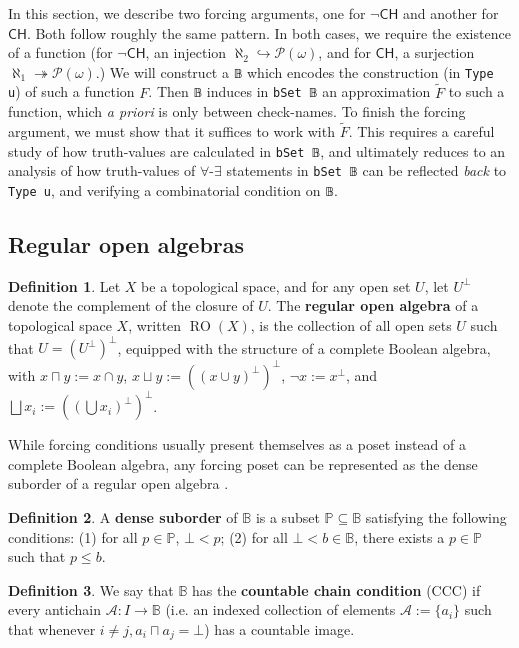 \documentclass[sigplan,10pt,review, autoref,anonymous]{acmart}
\newcommand{\B}{\mathbb{B}}
\newcommand{\lil}{\lstinline}
\newcommand{\CH}{\mathsf{CH}}
\theoremstyle{definition}
\newtheorem{defn}{Definition}[section]
\begin{document}
In this section, we describe two forcing arguments, one for \(\neg \CH\) and another for \(\CH\). Both follow roughly the same pattern. In both cases, we require the existence of a function (for \(\neg \CH\), an injection \(\aleph_2 \hookrightarrow \mathcal{P}(\omega)\), and for \(\CH\), a surjection \(\aleph_1 \twoheadrightarrow \mathcal{P}(\omega)\).) We will construct a \lil{𝔹}  which encodes the construction (in \lil{Type u}) of such a function \(F\). Then \lil{𝔹} induces in \lil{bSet 𝔹} an approximation \(\widetilde{F}\) to such a function, which \emph{a priori} is only between check-names. To finish the forcing argument, we must show that it suffices to work with \(\widetilde{F}\). This requires a careful study of how truth-values are calculated in \lil{bSet 𝔹}, and ultimately reduces to an analysis of how truth-values of \(\forall\)-\(\exists\) statements in \lil{bSet 𝔹} can be reflected \emph{back} to \lil{Type u}, and verifying a combinatorial condition on \lil{𝔹}.

\subsection{Regular open algebras}
\begin{defn}\label{def-regular-open-algebra}
  Let $X$ be a topological space, and for any open set $U$, let $U^\perp$ denote the complement of the closure of $U$. The \textbf{regular open algebra} of a topological space $X$, written $\operatorname{RO}(X)$, is the collection of all open sets $U$ such that $U = (U^\perp)^\perp$, equipped with the structure of a complete Boolean algebra, with $x \sqcap y := x \cap y$, $x \sqcup y := ((x \cup y)^\perp)^\perp$, $\neg x := x^\perp$, and $\bigsqcup x_i := ((\bigcup x_i)^\perp)^\perp$.
\end{defn}

While forcing conditions usually present themselves as a poset instead of a complete Boolean algebra, any forcing poset can be represented as the dense suborder of a regular open algebra \cite{moore2019method}.

\begin{defn}\label{def-dense-suborder}
  A \textbf{dense suborder} of \(\B\) is a subset \(\mathbb{P} \subseteq \B\) satisfying the following conditions: (1) for all \(p \in \mathbb{P}\), \(\bot < p\); (2) for all \(\bot < b \in \B\), there exists a \(p \in \mathbb{P}\) such that \(p \leq b\).
\end{defn}

\begin{defn}\label{def-ccc}
We say that $\B$ has the \textbf{countable chain condition} (CCC) if every antichain $\mathcal{A} : I \to \B$ (i.e. an indexed collection of elements $\mathcal{A} := \{a_i\}$ such that whenever $i \neq j, a_i \sqcap a_j = \bot$) has a countable image.
\end{defn}
\end{document}
